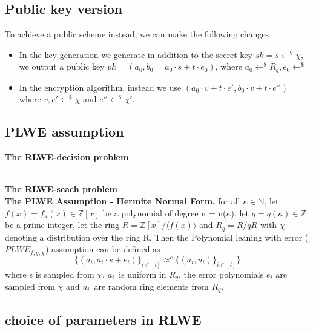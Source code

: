 \documentclass[../main.tex]{subfiles}
\begin{document}
    \subsection{Public key version}
	To achieve a public scheme instead, we can make the following changes
	\begin{itemize}
		\item In the key generation we generate in addition to the secret key $sk = s \leftarrow^{\$} \chi$, we output a public key
		        $pk = (a_0 , b_0 = a_0 \cdot s + t \cdot e_0)$, where $a_0 \leftarrow^{\$} R_q, e_0 \leftarrow^{\$}$
        \item In the encryption algorithm, instead we use 
        $(a_0 \cdot v + t \cdot e', b_0 \cdot v + t \cdot e'')$ where
        $v, e' \leftarrow^{\$} \chi$ and $e'' \leftarrow^{\$} \chi '$.
	\end{itemize}

    \subsection{PLWE assumption}
    \textbf{The RLWE-decision problem}
    
    \\[2mm]
    \textbf{The RLWE-seach problem}
    \\[2mm]
    \textbf{The PLWE Assumption - Hermite Normal Form.}
    for all $\kappa \in \mathbb{N}$, let $f(x) = f_{\kappa}(x) \in \mathbb{Z}[x]$
    be a polynomial of degree n = n($\kappa$), let $q = q(\kappa) \in \mathbb{Z}$
    be a prime integer, let the ring $R = \mathbb{Z}[x] / \langle f(x) \rangle$
    and $R_q = R / qR$ with $\chi$ denoting a distribution over the ring R. 
    Then the Polynomial leaning with error ($PLWE_{f,q,\chi}$) assumption can be defined as
    $$
        \{ (a_i, a_i \cdot s + e_i) \}_{i \in [l]} \approx^{c} \{(a_i, u_i) \}_{i \in [l]}\}
    $$
    where s is sampled from $\chi$, $a_i$ is uniform in $R_q$, the error polynomials
    $e_i$ are sampled from $\chi$ and $u_i$ are random ring elements from $R_q$.

    \subsection{choice of parameters in RLWE}
\end{document}
